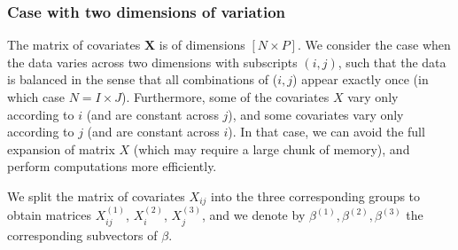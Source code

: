 \documentclass[12pt]{article}
\begin{document}
\subsubsection{Case with two dimensions of variation}
The matrix of covariates $\textbf{X}$ is of dimensions $[N \times P]$. We consider the case when the data varies across two dimensions with subscripts $(i,j)$, such that the data is balanced in the sense that all combinations of ($i,j$) appear exactly once (in which case $N = I \times J$). Furthermore, some of the covariates $X$ vary only according to $i$ (and are constant across $j$), and some covariates vary only according to $j$ (and are constant across $i$). In that case, we can avoid the full expansion of matrix $X$ (which may require a large chunk of memory), and perform computations more efficiently.

We split the matrix of covariates $X_{ij}$ into the three corresponding groups to obtain matrices $X^{(1)}_{ij}$, $X^{(2)}_{i}$, $X^{(3)}_{j}$, and we denote by $\beta^{(1)}, \beta^{(2)}, \beta^{(3)}$ the corresponding subvectors of $\beta$.
\end{document}
